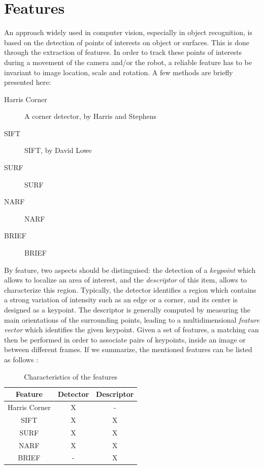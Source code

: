 \section{Features}

An approach widely used in computer vision, especially in object recognition, is based on the detection of points of interests on object or surfaces. This is done through the extraction of features. In order to track these points of interests during a movement of the camera and/or the robot, a reliable feature has to be invariant to image location, scale and rotation. A few methods are briefly presented here:

\begin{description}
\item[Harris Corner] A corner detector, by Harris and Stephens~\cite{Harris88alvey}
\item[\acrshort{SIFT}]\acrlong{SIFT}, by David Lowe~\cite{lowe_2004_sift} 
\item[\acrshort{SURF}]\acrlong{SURF}~\cite{surf}
\item[\acrshort{NARF}]\acrlong{NARF}~\cite{steder10irosws}
\item[\acrshort{BRIEF}]\acrlong{BRIEF}~\cite{Calonder10-brief}
\end{description}

By feature, two aspects should be distinguised: the detection of a \emph{keypoint} which allows to localize an area of interest, and the \emph{descriptor} of this item, allows to characterize this region. Typically, the detector identifies a region which contains a strong variation of intensity such as an edge or a corner, and its center is designed as a keypoint. The descriptor is generally computed by measuring the main orientations of the surrounding points, leading to a multidimensional \emph{feature vector} which identifies the given keypoint. Given a set of features, a matching can then be performed in order to associate pairs of keypoints, inside an image or between different frames. If we summarize, the mentioned features can be listed as follows :

\begin {table}
 \begin{center}
  \begin{tabular}{c|cc}
  \hline
  Feature & Detector & Descriptor \\
  \hline
  Harris Corner & X & - \\
  SIFT & X & X \\
  SURF & X & X \\
  NARF & X & X \\
  BRIEF & - & X \\
  \hline
  \end{tabular}
 \end{center}
\caption {Characteristics of the features}
\end{table}

